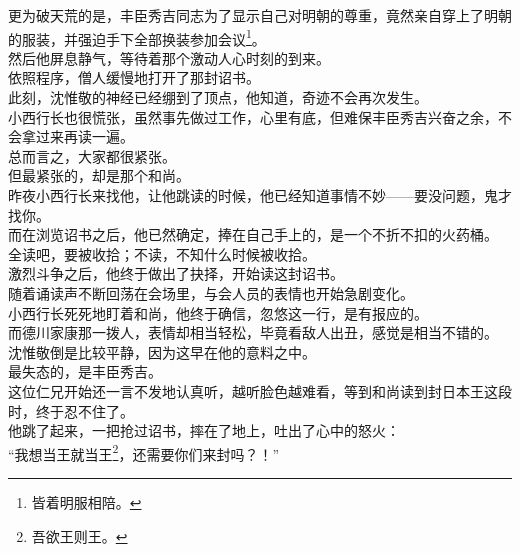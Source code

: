 \begin{multicols}{\theparacolNo}
更为破天荒的是，丰臣秀吉同志为了显示自己对明朝的尊重，竟然亲自穿上了明朝的服装，并强迫手下全部换装参加会议\footnote{皆着明服相陪。}。\\

然后他屏息静气，等待着那个激动人心时刻的到来。\\

依照程序，僧人缓慢地打开了那封诏书。\\

此刻，沈惟敬的神经已经绷到了顶点，他知道，奇迹不会再次发生。\\

小西行长也很慌张，虽然事先做过工作，心里有底，但难保丰臣秀吉兴奋之余，不会拿过来再读一遍。\\

总而言之，大家都很紧张。\\

但最紧张的，却是那个和尚。\\

昨夜小西行长来找他，让他跳读的时候，他已经知道事情不妙——要没问题，鬼才找你。\\

而在浏览诏书之后，他已然确定，捧在自己手上的，是一个不折不扣的火药桶。\\

全读吧，要被收拾；不读，不知什么时候被收拾。\\

激烈斗争之后，他终于做出了抉择，开始读这封诏书。\\

随着诵读声不断回荡在会场里，与会人员的表情也开始急剧变化。\\

小西行长死死地盯着和尚，他终于确信，忽悠这一行，是有报应的。\\

而德川家康那一拨人，表情却相当轻松，毕竟看敌人出丑，感觉是相当不错的。\\

沈惟敬倒是比较平静，因为这早在他的意料之中。\\

最失态的，是丰臣秀吉。\\

这位仁兄开始还一言不发地认真听，越听脸色越难看，等到和尚读到封日本王这段时，终于忍不住了。\\

他跳了起来，一把抢过诏书，摔在了地上，吐出了心中的怒火：\\

“我想当王就当王\footnote{吾欲王则王。}，还需要你们来封吗？！”\\


\end{multicols}
